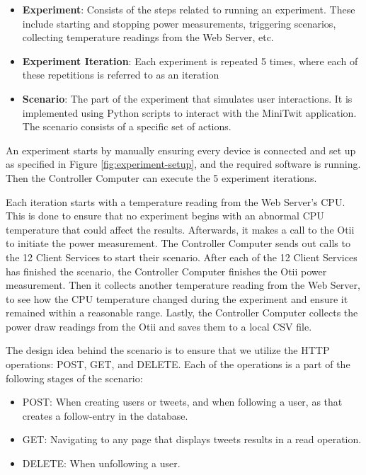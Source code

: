 \documentclass[main.tex]{subfiles}
\begin{document}
\begin{itemize}
    \item \textbf{Experiment}: Consists of the steps related to running an experiment. These include starting and stopping power measurements, triggering scenarios, collecting temperature readings from the Web Server, etc.
    \item \textbf{Experiment Iteration}: Each experiment is repeated 5 times, where each of these repetitions is referred to as an iteration
    \item \textbf{Scenario}: The part of the experiment that simulates user interactions. It is implemented using Python scripts to interact with the MiniTwit application. The scenario consists of a specific set of actions.
\end{itemize}

An experiment starts by manually ensuring every device is connected and set up as specified in Figure \ref{fig:experiment-setup}, and the required software is running. Then the Controller Computer can execute the 5 experiment iterations.

Each iteration starts with a temperature reading from the Web Server's CPU. This is done to ensure that no experiment begins with an abnormal CPU temperature that could affect the results. Afterwards, it makes a call to the Otii to initiate the power measurement. The Controller Computer sends out calls to the 12 Client Services to start their scenario. After each of the 12 Client Services has finished the scenario, the Controller Computer finishes the Otii power measurement. Then it collects another temperature reading from the Web Server, to see how the CPU temperature changed during the experiment and ensure it remained within a reasonable range. Lastly, the Controller Computer collects the power draw readings from the Otii and saves them to a local CSV file.

The design idea behind the scenario is to ensure that we utilize the HTTP operations: POST, GET, and DELETE. Each of the operations is a part of the following stages of the scenario:

\begin{itemize}
    \item POST: When creating users or tweets, and when following a user, as that creates a follow-entry in the database. 
    \item GET: Navigating to any page that displays tweets results in a read operation.
    \item DELETE: When unfollowing a user.
\end{itemize}
\end{document}

